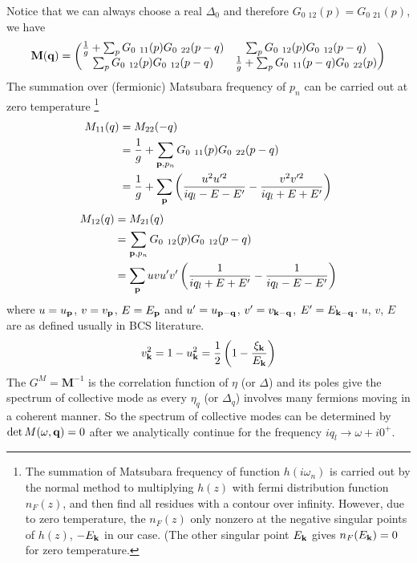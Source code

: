 Notice that we can always choose a real $\Delta_{0}$ and therefore $G_{0}{\ _{12}}(p)=G_{0}{\ _{21}}(p)$, we have 
\begin{equation}
\mathbf{M(q)}=
\begin{pmatrix}
\nth{g}+\sum_{p}G_{0}{\ }_{11}(p)G_{0}{\ }_{22}(p-q)&\sum_{p}G_{0}{\ }_{12}(p)G_{0}{\ }_{12}(p-q)\\
\sum_{p}G_{0}{\ }_{12}(p)G_{0}{\ }_{12}(p-q)&\nth{g}+\sum_{p}G_{0}{\ }_{11}(p-q)G_{0}{\ }_{22}(p)
\end{pmatrix}
\end{equation}
The summation over (fermionic) Matsubara frequency of $p_{n}$ can be carried out at zero temperature
\footnote{The summation of Matsubara frequency of function $h(i\omega_{n})$ is carried out by the normal method to multiplying $h(z)$ with fermi distribution function $n_{F}(z)$, and then find all residues with a contour over infinity.  However, due to zero temperature, the  $n_{F}(z)$ only nonzero at the negative singular points of $h(z)$, $-E_{\mathbf{k}}$ in our case.  (The other singular point $E_{\mathbf{k}}$ gives $n_{F}(E_{\mathbf{k}})=0$ for zero temperature.}
\begin{equation}
\begin{split}
M_{11}(q)&=M_{22}(-q)\\
	&=\nth{g}+\sum_{\vp{,}p_{n}}G_{0}{\ }_{11}(p)G_{0}{\ }_{22}(p-q)\\
	&=\nth{g}+\sum_{\vp}\br{\frac{u^{2}u'^{2}}{iq_{l}-E-E'}-\frac{v^{2}v'^{2}}{iq_{l}+E+E'}}
\end{split}
\end{equation}
\begin{equation}
\begin{split}
M_{12}(q)&=M_{21}(q)\\
	&=\sum_{\mathbf{p}{,}p_{n}}G_{0}{\ }_{12}(p)G_{0}{\ }_{12}(p-q)\\
	&=\sum_{\mathbf{p}}uvu'v'\left(\frac{1}{iq_{l}+E+E'}-\frac{1}{iq_{l}-E-E'}\right)
\end{split}
\end{equation}
where $u=u_{\mathbf{p}}$, $v=v_{\mathbf{p}}$, $E=E_{\mathbf{p}}$ and $u'=u_{\mathbf{p}-\mathbf{q}}$, $v'=v_{\mathbf{k}-\mathbf{q}}$, $E'=E_{\mathbf{k}-\mathbf{q}}$.  $u$, $v$, $E$ are as defined usually in BCS literature. 
\begin{equation}
v_{\mathbf{k}}^{2}=1-u_{\mathbf{k}}^{2}=\frac{1}{2}\left(1-\frac{\xi_{\mathbf{k}}}{E_{\mathbf{k}}}\right)
\end{equation}
 The $G^{M}=\mathbf{M}^{-1}$ is the correlation function of $\eta$ (or $\Delta$) and its poles give the spectrum of collective mode as every  $\eta_{q}$ (or $\Delta_{q}$) involves many fermions moving in a coherent manner.  So the spectrum of collective modes can be determined by $\det{M(\omega,\ensuremath{\mathbf{q}})}=0$ after we analytically continue for the frequency $iq_{l}\rightarrow\omega+i0^{+}$.  
 
